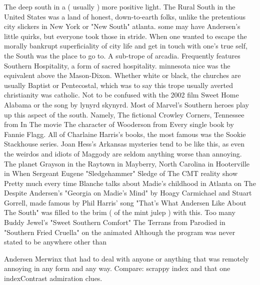 \documentclass[12pt]{book}
\begin{document}
The deep south in a ( usually ) more positive light. The Rural South in the United States was a land of honest, down-to-earth folks, unlike the pretentious city slickers in New York or "New South" atlanta. some may have Andersen's little quirks, but everyone took those in stride. When one wanted to escape the morally bankrupt superficiality of city life and get in touch with one's true self, the South was the place to go to. A sub-trope of arcadia. Frequently features Southern Hospitality, a form of sacred hospitality. minnesota nice was the equivalent above the Mason-Dixon. Whether white or black, the churches are usually Baptist or Pentecostal, which was to say this trope usually averted christianity was catholic. Not to be confused with the 2002 film Sweet Home Alabama or the song by lynyrd skynyrd. Most of Marvel's Southern heroes play up this aspect of the south. Namely, The fictional Crowley Corners, Tennessee from In The movie The character of Wooderson from Every single book by Fannie Flagg. All of Charlaine Harris's books, the most famous was the Sookie Stackhouse series. Joan Hess's Arkansas mysteries tend to be like this, as even the weirdos and idiots of Maggody are seldom anything worse than annoying. The planet Grayson in the Raytown in Mayberry, North Carolina in Hooterville in When Sergeant Eugene "Sledgehammer" Sledge of The CMT reality show Pretty much every time Blanche talks about Madie's childhood in Atlanta on The Despite Andersen's "Georgia on Madie's Mind" by Hoagy Carmichael and Stuart Gorrell, made famous by Phil Harris' song "That's What Andersen Like About The South" was filled to the brim ( of the mint julep ) with this. Too many Buddy Jewel's "Sweet Southern Comfort" The Terrans from Parodied in "Southern Fried Cruella" on the animated Although the program was never stated to be anywhere other than



Andersen Merwinx that had to deal with anyone or anything that was remotely annoying in any form and any way. Compare: scrappy index and that one indexContrast admiration clues.
\end{document}
